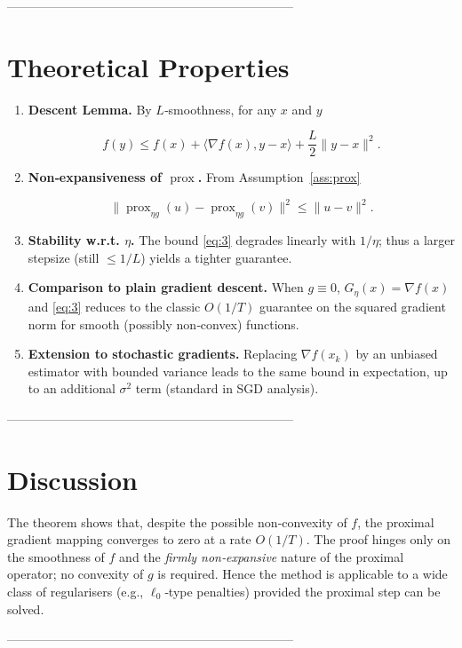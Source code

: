 \documentclass{article}
\newcommand{\prox}{\operatorname{prox}}
\newcommand{\grad}{\nabla}
\begin{document}
---------------------------------------------------------------------

\section*{Theoretical Properties}
\begin{enumerate}
\item \textbf{Descent Lemma.} By $L$‑smoothness, for any $x$ and $y$  

\[
f(y)\le f(x)+\langle\grad f(x),y-x\rangle+\frac{L}{2}\|y-x\|^{2}.
\tag{P1}
\]

\item \textbf{Non‑expansiveness of $\prox$.} From Assumption~\ref{ass:prox}  

\[
\|\prox_{\eta g}(u)-\prox_{\eta g}(v)\|^{2}\le\|u-v\|^{2}.
\tag{P2}
\]

\item \textbf{Stability w.r.t. $\eta$.} The bound \eqref{eq:3} degrades linearly with $1/\eta$; thus a larger stepsize (still $\le 1/L$) yields a tighter guarantee.

\item \textbf{Comparison to plain gradient descent.} When $g\equiv0$, $G_{\eta}(x)=\grad f(x)$ and \eqref{eq:3} reduces to the classic $O(1/T)$ guarantee on the squared gradient norm for smooth (possibly non‑convex) functions.

\item \textbf{Extension to stochastic gradients.} Replacing $\grad f(x_{k})$ by an unbiased estimator with bounded variance leads to the same bound in expectation, up to an additional $\sigma^{2}$ term (standard in SGD analysis).
\end{enumerate}

---------------------------------------------------------------------

\section*{Discussion}
The theorem shows that, despite the possible non‑convexity of $f$, the proximal gradient mapping converges to zero at a rate $O(1/T)$. The proof hinges only on the smoothness of $f$ and the \emph{firmly non‑expansive} nature of the proximal operator; no convexity of $g$ is required. Hence the method is applicable to a wide class of regularisers (e.g., $\ell_{0}$‑type penalties) provided the proximal step can be solved.

---------------------------------------------------------------------
\end{document}
